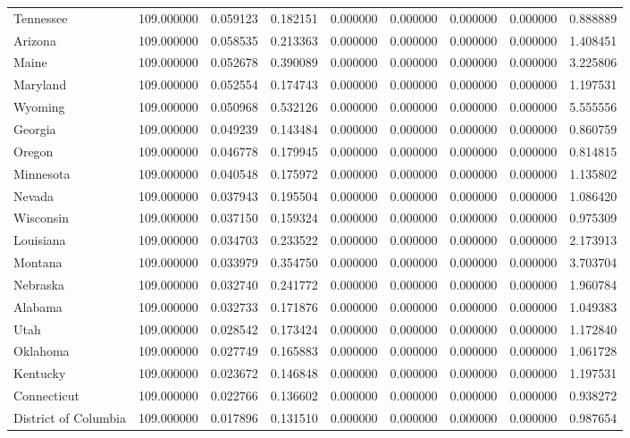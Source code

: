 \begin{tabular}{lrrrrrrrr}
Tennessee & 109.000000 & 0.059123 & 0.182151 & 0.000000 & 0.000000 & 0.000000 & 0.000000 & 0.888889 \\
Arizona & 109.000000 & 0.058535 & 0.213363 & 0.000000 & 0.000000 & 0.000000 & 0.000000 & 1.408451 \\
Maine & 109.000000 & 0.052678 & 0.390089 & 0.000000 & 0.000000 & 0.000000 & 0.000000 & 3.225806 \\
Maryland & 109.000000 & 0.052554 & 0.174743 & 0.000000 & 0.000000 & 0.000000 & 0.000000 & 1.197531 \\
Wyoming & 109.000000 & 0.050968 & 0.532126 & 0.000000 & 0.000000 & 0.000000 & 0.000000 & 5.555556 \\
Georgia & 109.000000 & 0.049239 & 0.143484 & 0.000000 & 0.000000 & 0.000000 & 0.000000 & 0.860759 \\
Oregon & 109.000000 & 0.046778 & 0.179945 & 0.000000 & 0.000000 & 0.000000 & 0.000000 & 0.814815 \\
Minnesota & 109.000000 & 0.040548 & 0.175972 & 0.000000 & 0.000000 & 0.000000 & 0.000000 & 1.135802 \\
Nevada & 109.000000 & 0.037943 & 0.195504 & 0.000000 & 0.000000 & 0.000000 & 0.000000 & 1.086420 \\
Wisconsin & 109.000000 & 0.037150 & 0.159324 & 0.000000 & 0.000000 & 0.000000 & 0.000000 & 0.975309 \\
Louisiana & 109.000000 & 0.034703 & 0.233522 & 0.000000 & 0.000000 & 0.000000 & 0.000000 & 2.173913 \\
Montana & 109.000000 & 0.033979 & 0.354750 & 0.000000 & 0.000000 & 0.000000 & 0.000000 & 3.703704 \\
Nebraska & 109.000000 & 0.032740 & 0.241772 & 0.000000 & 0.000000 & 0.000000 & 0.000000 & 1.960784 \\
Alabama & 109.000000 & 0.032733 & 0.171876 & 0.000000 & 0.000000 & 0.000000 & 0.000000 & 1.049383 \\
Utah & 109.000000 & 0.028542 & 0.173424 & 0.000000 & 0.000000 & 0.000000 & 0.000000 & 1.172840 \\
Oklahoma & 109.000000 & 0.027749 & 0.165883 & 0.000000 & 0.000000 & 0.000000 & 0.000000 & 1.061728 \\
Kentucky & 109.000000 & 0.023672 & 0.146848 & 0.000000 & 0.000000 & 0.000000 & 0.000000 & 1.197531 \\
Connecticut & 109.000000 & 0.022766 & 0.136602 & 0.000000 & 0.000000 & 0.000000 & 0.000000 & 0.938272 \\
District of Columbia & 109.000000 & 0.017896 & 0.131510 & 0.000000 & 0.000000 & 0.000000 & 0.000000 & 0.987654 \\

\end{tabular}
